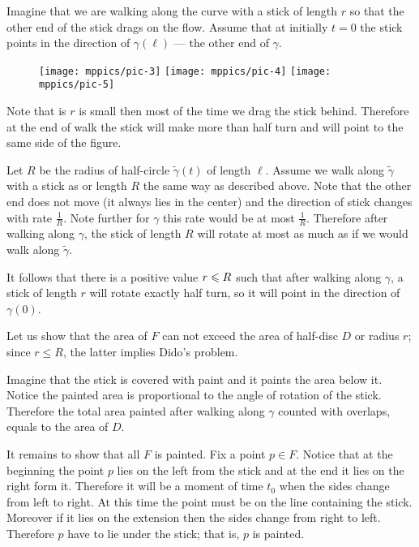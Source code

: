 Imagine that we are walking along the curve with a stick of length $r$ so that the other end of the stick drags on the flow.
Assume that at initially $t=0$ the stick points in the direction of $\gamma(\ell)$ --- the other end of $\gamma$.

\begin{wrapfigure}{r}{34 mm}
\vskip-0mm
\centering
\texttt{[image: mppics/pic-3]}
\bigskip
\texttt{[image: mppics/pic-4]}
\bigskip
\texttt{[image: mppics/pic-5]}
\end{wrapfigure}

Note that is $r$ is small then most of the time we drag the stick behind. Therefore at the end of walk the stick will make more than half turn and will point to the same side of the figure.

Let $R$ be the radius of half-circle $\tilde\gamma(t)$ of length $\ell$.
Assume we walk along $\tilde\gamma$  with a stick as or length $R$ the same way as described above.
Note that the other end does not move (it always lies in the center) and the direction of stick changes with rate $\tfrac1R$.
Note further for $\gamma$ this rate would be at most $\tfrac1R$.
Therefore after walking along $\gamma$,
the stick of length $R$ will rotate at most as much as if we would walk along $\tilde\gamma$.

It follows that there is a positive value $r\z\le R$ such that after walking along $\gamma$, a stick of length $r$ will rotate exactly half turn, so it will point in the direction of $\gamma(0)$.

Let us show that the area of $F$ can not exceed the area of half-disc $D$ or radius $r$;
since $r\le R$, the latter implies Dido's problem.

Imagine that the stick is covered with paint and it paints the area below it.
Notice the painted area is proportional to the angle of rotation of the stick.
Therefore the total area painted after walking along $\gamma$ counted with overlaps, equals to the area of $D$.

It remains to show that all $F$ is painted.
Fix a point $p\in F$.
Notice that at the beginning the point $p$ lies on the left from the stick and at the end it lies on the right form it.
Therefore it will be a moment of time $t_0$ when the sides change from left to right.
At this time the point must be on the line containing the stick. 
Moreover if it lies on the extension then the sides change from right to left. Therefore $p$ have to lie under the stick; that is, $p$ is painted.
\qeds


